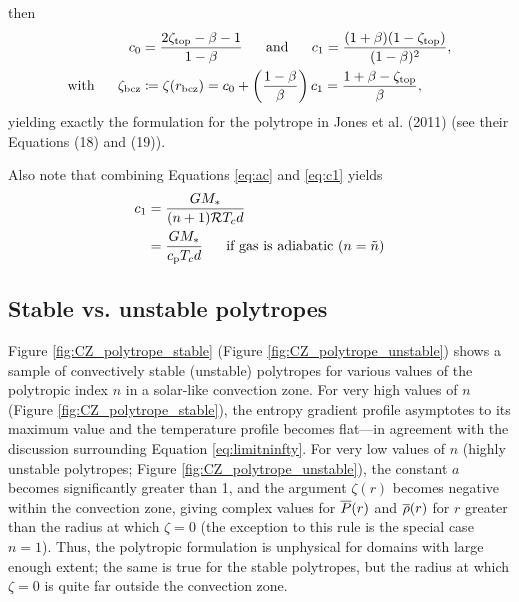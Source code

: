 \documentclass[12pt]{article}
\begin{document}
then 
\begin{subequations}
\begin{align}
c_0 &= \frac{2\zeta_{\rm{top}} - \beta - 1}{1-\beta} \ \ \ \ \ \text{and}\ \ \ \ \  c_1 = \frac{(1+\beta)(1-\zeta_{\rm{top}})}{(1-\beta)^2},\\
\text{with}\ \ \ \ \  \zeta_{\rm{bcz}}   &\coloneqq      \zeta(r_{\rm{bcz}}) = c_0+\left(\frac{1-\beta}{\beta}\right)c_1 = \frac{1+\beta - \zeta_{\rm{top}}}{\beta},
\label{eq:c01_from_zeta0}
\end{align}
\end{subequations}
yielding exactly the formulation for the polytrope in Jones et al. (2011) (see their Equations (18) and (19)). 

Also note that combining Equations \eqref{eq:ac} and \eqref{eq:c1} yields
\begin{subequations}
\begin{align}
	c_1&=\frac{GM_*}{(n+1)\mathcal{R} T_cd}\\
	&= \frac{GM_*}{c_{\rm{p}} T_cd}\ \ \ \ \ \text{if gas is adiabatic $(n=\tilde{n})$}\\
\end{align}
\end{subequations}

\subsection{Stable vs. unstable polytropes}
Figure \ref{fig:CZ_polytrope_stable} (Figure \ref{fig:CZ_polytrope_unstable}) shows a sample of convectively stable (unstable) polytropes for various values of the polytropic index $n$ in a solar-like convection zone. For very high values of $n$ (Figure \ref{fig:CZ_polytrope_stable}), the entropy gradient profile asymptotes to its maximum value and the temperature profile becomes flat---in agreement with the discussion surrounding Equation \eqref{eq:limitninfty}. For very low values of $n$ (highly unstable polytropes; Figure \ref{fig:CZ_polytrope_unstable}), the constant $a$ becomes significantly greater than 1, and the argument $\zeta(r)$ becomes negative within the convection zone, giving complex values for $\overline{P}(r)$ and $\overline{\rho}(r)$ for $r$ greater than the radius at which $\zeta=0$ (the exception to this rule is the special case $n=1$). Thus, the polytropic formulation is unphysical for domains with large enough extent; the same is true for the stable polytropes, but the radius at which $\zeta=0$ is quite far outside the convection zone.
\end{document}
